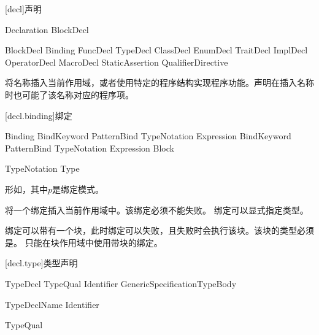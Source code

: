 
[decl]{声明}

\begin{bnf}{Declaration}
    BlockDecl
\end{bnf}

\begin{bnf}{BlockDecl}
    Binding \br
    FuncDecl \br
    TypeDecl \br
    ClassDecl \br
    EnumDecl \br
    TraitDecl \br
    ImplDecl \br
    OperatorDecl \br
    MacroDecl \br
    StaticAssertion \br
    QualifierDirective
\end{bnf}

\pnum
{}将名称插入当前作用域，或者使用特定的程序结构实现程序功能。声明在插入名称时也可能了该名称对应的程序项。

[decl.binding]{绑定}

\begin{bnf}{Binding}
    BindKeyword PatternBind TypeNotation\bnfq \terminal{=} Expression \terminal{;} \br
    BindKeyword PatternBind TypeNotation\bnfq \terminal{=} Expression  Block
\end{bnf}

\begin{bnf}{TypeNotation}
    \terminal{:} Type
\end{bnf}

\pnum
{}形如，其中$p$是绑定模式。

\pnum
{}将一个绑定插入当前作用域中。该绑定必须不能失败。
绑定可以显式指定类型。

\pnum
绑定可以带有一个块，此时绑定可以失败，且失败时会执行该块。该块的类型必须是。
只能在块作用域中使用带块的绑定。

[decl.type]{类型声明}

\begin{bnf}{TypeDecl}
    TypeQual\bnfs {} Identifier GenericSpecification\bnfq TypeBody
\end{bnf}

\begin{bnf}{TypeDeclName}
    Identifier \br
\end{bnf}

\begin{bnf}{TypeQual}
     \br
     \br
\end{bnf}

